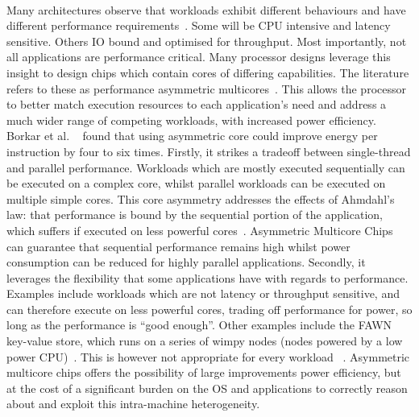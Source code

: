 \paragraph{} Many architectures observe that workloads exhibit different behaviours and have different performance requirements~\cite{greenhalgh2011biglittle}. Some will be CPU intensive and latency sensitive. Others IO bound and optimised for throughput. Most importantly, not all applications are performance critical. Many processor designs
leverage this insight to design chips which contain cores of differing 
capabilities. The literature refers to these as performance asymmetric multicores~\cite{balakrishnan2005impactperfasym}. This allows the processor to better match execution resources to each  application's need and address a much wider range of competing workloads, 
with increased power efficiency. Borkar et al. ~\cite{borkar2011future} found that using asymmetric core could improve energy per instruction by four to six times. Firstly, it strikes a tradeoff between single-thread and parallel performance. Workloads which are mostly executed sequentially can be executed on a complex core, whilst parallel workloads can be executed on multiple simple cores. This core asymmetry addresses the effects of Ahmdahl's law: that performance is bound by the sequential portion of the application, which suffers if executed on less powerful cores~\cite{4563876}. Asymmetric Multicore Chips can guarantee that sequential performance remains high whilst power consumption can be reduced for highly parallel applications. Secondly, it leverages the flexibility that some applications have with regards to performance. Examples include workloads which are not latency or throughput sensitive, and can therefore execute on less powerful cores, trading off performance for power, so long as the performance is ``good enough''. Other examples include the FAWN key-value store, which runs on a series of wimpy nodes (nodes powered by a low power CPU)~\cite{andersen2009fawn}. This is however not appropriate for every workload ~\cite{lang2010nonwimpy}.
Asymmetric multicore chips offers the possibility of large improvements power efficiency, but at the cost of a significant burden on the OS and applications to correctly reason about and exploit this intra-machine heterogeneity. 

